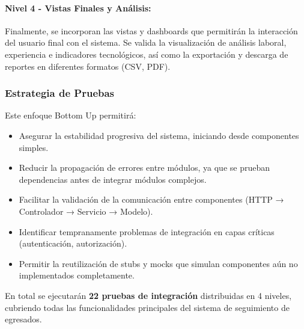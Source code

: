 \paragraph{Nivel 4 - Vistas Finales y Análisis:}
Finalmente, se incorporan las vistas y dashboards que permitirán la interacción del usuario final con el sistema. Se valida la visualización de análisis laboral, experiencia e indicadores tecnológicos, así como la exportación y descarga de reportes en diferentes formatos (CSV, PDF).

\subsubsection{Estrategia de Pruebas}

Este enfoque Bottom Up permitirá:

\begin{itemize}
\item Asegurar la estabilidad progresiva del sistema, iniciando desde componentes simples.
\item Reducir la propagación de errores entre módulos, ya que se prueban dependencias antes de integrar módulos complejos.
\item Facilitar la validación de la comunicación entre componentes (HTTP → Controlador → Servicio → Modelo).
\item Identificar tempranamente problemas de integración en capas críticas (autenticación, autorización).
\item Permitir la reutilización de stubs y mocks que simulan componentes aún no implementados completamente.
\end{itemize}

En total se ejecutarán \textbf{22 pruebas de integración} distribuidas en 4 niveles, cubriendo todas las funcionalidades principales del sistema de seguimiento de egresados.
